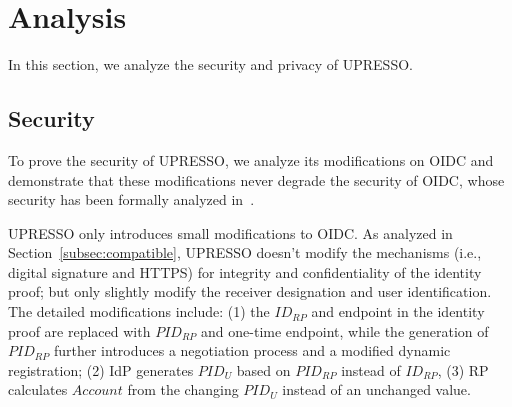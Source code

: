 \section{Analysis}
\label{sec:analysis}
In this section, we analyze the security and privacy of UPRESSO.

\subsection{Security}
\label{subsec:security}
To prove the security of UPRESSO, we analyze its modifications on OIDC and demonstrate that these modifications never degrade the security of OIDC,
whose security  has been formally analyzed in~\cite{FettKS17}.

UPRESSO only introduces small modifications to OIDC. As analyzed in Section~\ref{subsec:compatible}, UPRESSO doesn't modify the mechanisms (i.e., digital signature and HTTPS) for integrity and confidentiality of the identity proof; but only slightly modify the receiver designation and user identification.
The detailed modifications include: (1) the $ID_{RP}$ and endpoint in the identity proof are replaced with $PID_{RP}$ and one-time endpoint, while the generation of $PID_{RP}$ further introduces  a negotiation process and a modified dynamic registration;
 (2) IdP generates $PID_U$ based on $PID_{RP}$ instead of $ID_{RP}$, (3) RP calculates $Account$ from the changing $PID_U$ instead of an unchanged value.

